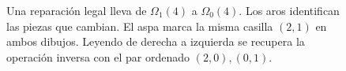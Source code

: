 \begin{figure}[htbp]
\centering
{}
\caption{Una reparación legal lleva de $\Omega_1(4)$ a $\Omega_0(4)$.
Los aros identifican las piezas que cambian. El aspa marca la misma casilla
$(2,1)$ en ambos dibujos. Leyendo de derecha a izquierda se recupera la operación
inversa con el par ordenado $(2,0),(0,1)$.}
\label{fig:reparacion-tablero}
\end{figure}
